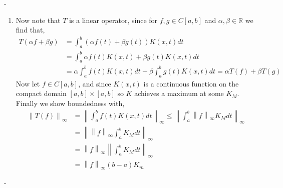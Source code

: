 \documentclass[12pt]{article}
\makeatletter
\theoremstyle{ex215}
\newcounter{probcount}
\newlength\probsep
\newlength\pshrinking
\newenvironment{problems}%
  {\ifhmode\unskip\par\fi\setcounter{probcount}{0}\probsep\parskip
  \sbox\@tempboxa{\textbf{9.}}\pshrinking\wd\@tempboxa\advance\pshrinking\labelsep
  \advance\linewidth -\pshrinking
  \advance\@totalleftmargin\pshrinking
  \advance\leftskip\pshrinking}%
  {\ifhmode\unskip \par\fi\advance\leftskip-\pshrinking}%
\renewenvironment{proof}[1][\proofname]{\par
  \pushQED{\qed}%
  \normalfont \topsep6\p@\@plus6\p@\relax
  \trivlist
  \@topsep \topsep
  \item[\hskip\labelsep
        \itshape
    #1\@addpunct{.}]\ignorespaces
}{%
  \popQED\endtrivlist\@endpefalse
}
\newcommand{\Reals}{\ensuremath{\mathbb R}}
\newcommand{\norm}[2]{\left \lVert #1 \right \rVert_{#2}}
\let\RR\Reals
\makeatother
\begin{document}
\begin{problems}
\begin{enumerate}
\begin{proof}
        Now note that $T$ is a linear operator, since for $f, g \in C[a, b]$ and $\alpha , \beta \in \RR$ we find that, 
        \begin{align*}
          T(\alpha f + \beta g) &= \int_{a }^{b } \left(\alpha f(t) + \beta g(t) \right) K(x, t)dt\\ 
          &= \int_{a }^{b }\alpha f(t)K(x, t) + \beta g(t)K(x, t) dt \\
          &= \alpha \int_{a }^{b }f(t)K(x, t)dt+ \beta \int_{a }^{b } g(t)K(x, t) dt = \alpha T(f) + \beta T(g)
        \end{align*}
        Now let $f \in C[a, b]$, and since $K(x, t)$ is a continuous function on the compact domain $[a, b] \times [a, b]$ so $K$ achieves a maximum at some $K_M$. Finally we show boundedness with, 
        \begin{align*}
          \norm{T(f)}{\infty} &= \norm{\int_{a }^{b } f(t) K(x, t)dt}{\infty} \leq \norm{\int_{a }^{b } \norm{f}{\infty} K_M dt}{\infty}\\
           &= \norm{\norm{f}{\infty} \int_{a }^{b } K_M dt}{\infty}\\
           &= \norm{f}{\infty} \norm{\int_{a }^{b } K_M dt}{\infty}\\
           &= \norm{f}{\infty} (b - a)K_m
        \end{align*}
      \end{proof}


      \vspace*{.15in}


\end{enumerate}
\end{problems}
\end{document}
